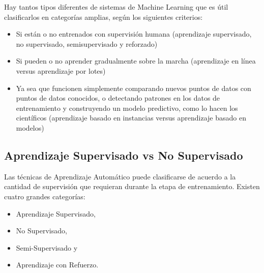 \documentclass[10pt,a4paper]{book}
\begin{document}
Hay tantos tipos diferentes de sistemas de Machine Learning que es útil clasificarlos en categorías amplias, según los siguientes criterios:
\begin{itemize}
\item Si están o no entrenados con supervisión humana (aprendizaje supervisado, no supervisado, semisupervisado y reforzado)
\item Si pueden o no aprender gradualmente sobre la marcha (aprendizaje en línea versus aprendizaje por lotes)
\item Ya sea que funcionen simplemente comparando nuevos puntos de datos con puntos de datos conocidos, o detectando patrones en los datos de entrenamiento y construyendo un modelo predictivo, como lo hacen los científicos (aprendizaje basado en instancias versus aprendizaje basado en modelos)
\end{itemize}


\begin{center}


\end{center}

\subsection{Aprendizaje Supervisado vs No Supervisado}

Las t\'ecnicas de Aprendizaje Autom\'atico puede clasificarse de acuerdo a la cantidad de supervisi\'on que requieran durante la etapa de entrenamiento.  Existen cuatro grandes categor\'ias: 
\begin{itemize}
\item Aprendizaje Supervisado,  
\item No Supervisado,  
\item Semi-Supervisado y 
\item Aprendizaje con Refuerzo.
\end{itemize}
\end{document}
